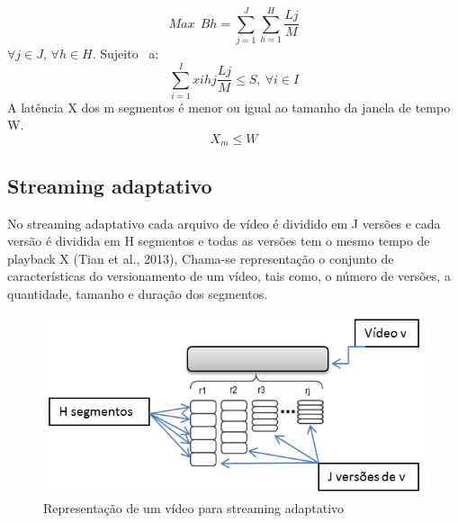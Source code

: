 \documentclass[
	12pt,				%
	oneside,			%
	a4paper,			%
	english,			%
	brazil				%
	]{abntex2ppgsi}
\begin{document}
\begin{equation}
Max  \ \ Bh=\sum_{j=1}^{J}\sum_{h=1}^{H}\frac{Lj}{M}
\end{equation}\newline
$\forall j \in J$, $\forall h \in H.$
\newline
Sujeito \ a:
\begin{equation}
\sum_{i=1}^{I}xihj\frac{Lj}{M} \leq S ,\ \forall i \in I
\end{equation}A latência X dos m segmentos é menor ou igual ao tamanho da janela de tempo W.
\begin{equation}
X_m \leq W
\end{equation}


\subsection{Streaming adaptativo}

No streaming adaptativo cada arquivo de vídeo é dividido em J versões e cada versão é dividida em H segmentos e todas as versões tem o mesmo tempo de playback X (Tian et al., 2013), Chama-se representação o conjunto de características do versionamento de um vídeo, tais como, o número de versões, a quantidade, tamanho e duração dos segmentos.


\begin{figure}[H]%
	\centering
 	  \caption{Representação de um vídeo para streaming adaptativo}
		\includegraphics{figuras/segmentos.png}
\end{figure}
\end{document}
